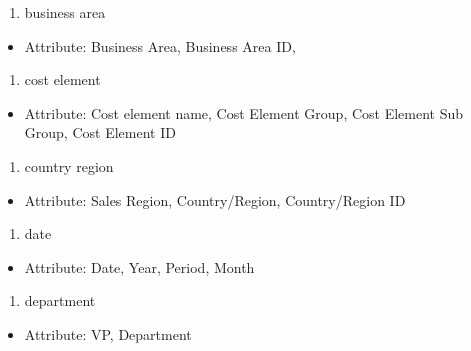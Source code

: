 \documentclass[]{book}
\providecommand{\tightlist}{%
  \setlength{\itemsep}{0pt}\setlength{\parskip}{0pt}}
\begin{document}
\begin{enumerate}
\def\labelenumi{\arabic{enumi}.}
\tightlist
\item
  business area
\end{enumerate}

\begin{itemize}
\tightlist
\item
  Attribute: Business Area, Business Area ID,
\end{itemize}

\begin{enumerate}
\def\labelenumi{\arabic{enumi}.}
\setcounter{enumi}{1}
\tightlist
\item
  cost element
\end{enumerate}

\begin{itemize}
\tightlist
\item
  Attribute: Cost element name, Cost Element Group, Cost Element Sub
  Group, Cost Element ID
\end{itemize}

\begin{enumerate}
\def\labelenumi{\arabic{enumi}.}
\setcounter{enumi}{2}
\tightlist
\item
  country region
\end{enumerate}

\begin{itemize}
\tightlist
\item
  Attribute: Sales Region, Country/Region, Country/Region ID
\end{itemize}

\begin{enumerate}
\def\labelenumi{\arabic{enumi}.}
\setcounter{enumi}{3}
\tightlist
\item
  date
\end{enumerate}

\begin{itemize}
\tightlist
\item
  Attribute: Date, Year, Period, Month
\end{itemize}

\begin{enumerate}
\def\labelenumi{\arabic{enumi}.}
\setcounter{enumi}{4}
\tightlist
\item
  department
\end{enumerate}

\begin{itemize}
\tightlist
\item
  Attribute: VP, Department
\end{itemize}
\end{document}
